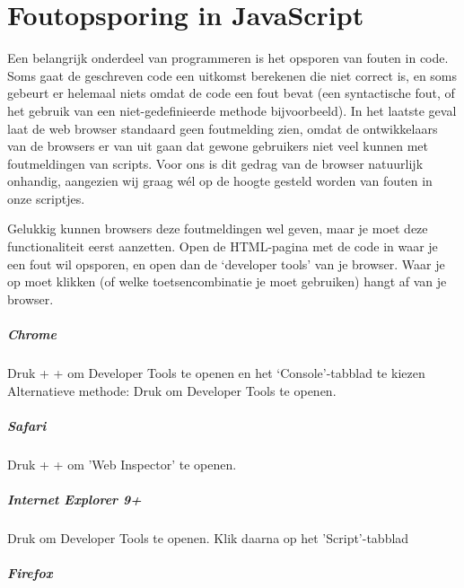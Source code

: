 \chapter{Foutopsporing in JavaScript}

Een belangrijk onderdeel van programmeren is het opsporen van fouten in code. Soms gaat de geschreven code een uitkomst berekenen die niet correct is, en soms gebeurt er helemaal niets omdat de code een fout bevat (een syntactische fout, of het gebruik van een niet-gedefinieerde methode bijvoorbeeld). In het laatste geval laat de web browser standaard geen foutmelding zien, omdat de ontwikkelaars van de browsers er van uit gaan dat gewone gebruikers niet veel kunnen met foutmeldingen van scripts. Voor ons is dit gedrag van de browser natuurlijk onhandig, aangezien wij graag w\'el op de hoogte gesteld worden van fouten in onze scriptjes.

Gelukkig kunnen browsers deze foutmeldingen wel geven, maar je moet deze functionaliteit eerst aanzetten. Open de HTML-pagina met de code in waar je een fout wil opsporen, en open dan de `developer tools' van je browser. Waar je op moet klikken (of welke toetsencombinatie je moet gebruiken) hangt af van je browser.

\paragraph{Chrome}

Druk  +  +  om Developer Tools te openen en het `Console'-tabblad te kiezen
Alternatieve methode: Druk  om Developer Tools te openen.

\paragraph{Safari}

Druk  +  +  om 'Web Inspector' te openen.

\paragraph{Internet Explorer 9+}

Druk  om Developer Tools te openen. Klik daarna op het 'Script'-tabblad

\paragraph{Firefox}

